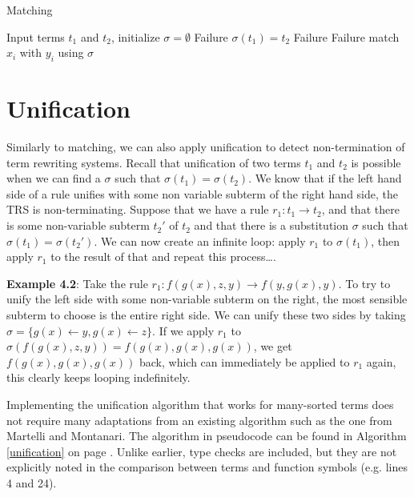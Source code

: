 \begin{algorithm}
\caption{Matching}
\label{matching}
\begin{algorithmic}[1]
\STATE Input terms $t_1$ and $t_2$, initialize $\sigma = \emptyset$
      \RETURN Failure
    \ENDIF
  \ELSE
    \STATE $\sigma(t_1) = t_2$
  \ENDIF
{}
    \RETURN Failure
      \RETURN Failure
    \ENDIF
      \STATE match $x_i$ with $y_i$ using $\sigma$
    \ENDFOR
  \ENDIF
\ENDIF
\end{algorithmic}
\end{algorithm}

\section{Unification}
Similarly to matching, we can also apply unification to detect non-termination of term rewriting systems. Recall that unification of two terms $t_1$ and $t_2$ is possible when we can find a $\sigma$ such that $\sigma(t_1) = \sigma(t_2)$. We know that if the left hand side of a rule unifies with some non variable subterm of the right hand side, the TRS is non-terminating.\newline
Suppose that we have a rule $r_1: t_1 \rightarrow t_2$, and that there is some non-variable subterm $t_2'$ of $t_2$ and that there is a substitution $\sigma$ such that $\sigma(t_1) = \sigma(t_2')$. We can now create an infinite loop: apply $r_1$ to $\sigma(t_1)$, then apply $r_1$ to the result of that and repeat this process\dots.

\textbf{Example 4.2}: Take the rule $r_1: f(g(x), z, y) \rightarrow f(y, g(x), y)$. To try to unify the left side with some non-variable subterm on the right, the most sensible subterm to choose is the entire right side. We can unify these two sides by taking $\sigma = \{ g(x) \leftarrow y, g(x) \leftarrow z \}$. If we apply $r_1$ to $\sigma(f(g(x), z, y)) = f(g(x), g(x), g(x))$, we get $f(g(x), g(x), g(x))$ back, which can immediately be applied to $r_1$ again, this clearly keeps looping indefinitely.

Implementing the unification algorithm that works for many-sorted terms does not require many adaptations from an existing algorithm such as the one from Martelli and Montanari.\cite{Martelli:1982} The algorithm in pseudocode can be found in Algorithm \ref{unification} on page \pageref{unification}. Unlike earlier, type checks are included, but they are not explicitly noted in the comparison between terms and function symbols (e.g. lines 4 and 24).  

